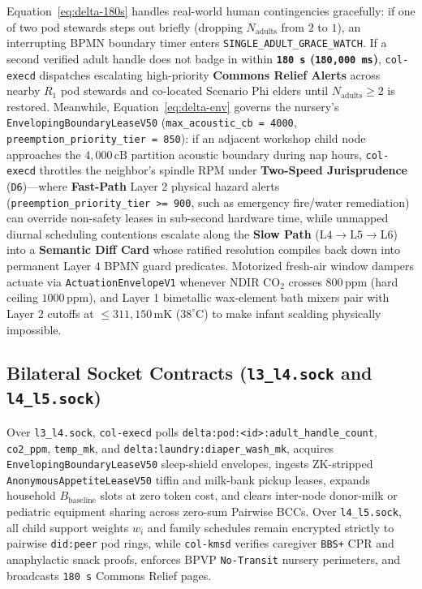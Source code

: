 Equation~\eqref{eq:delta-180s} handles real-world human contingencies gracefully: if one of
two pod stewards steps out briefly (dropping $N_{\mathrm{adults}}$ from $2$ to $1$), an
interrupting BPMN boundary timer enters \texttt{SINGLE\_ADULT\_GRACE\_WATCH}. If a second
verified adult handle does not badge in within \textbf{\texttt{180 s} (\texttt{180,000 ms})},
\texttt{col-execd} dispatches escalating high-priority \textbf{Commons Relief Alerts} across
nearby $R_1$ pod stewards and co-located Scenario Phi elders until $N_{\mathrm{adults}} \ge 2$
is restored. Meanwhile, Equation~\eqref{eq:delta-env} governs the nursery's
\texttt{EnvelopingBoundaryLeaseV50} (\texttt{max\_acoustic\_cb = 4000},
\texttt{preemption\_priority\_tier = 850}): if an adjacent workshop child node approaches the
$4{,}000\,\mathrm{cB}$ partition acoustic boundary during nap hours, \texttt{col-execd}
throttles the neighbor's spindle RPM under \textbf{Two-Speed Jurisprudence} (\texttt{D6})---where
\textbf{Fast-Path} Layer 2 physical hazard alerts (\texttt{preemption\_priority\_tier >= 900},
such as emergency fire/water remediation) can override non-safety leases in sub-second hardware
time, while unmapped diurnal scheduling contentions escalate along the \textbf{Slow Path}
($\mathrm{L4} \to \mathrm{L5} \to \mathrm{L6}$) into a \textbf{Semantic Diff Card} whose ratified
resolution compiles back down into permanent Layer 4 BPMN guard predicates. Motorized fresh-air
window dampers actuate via \texttt{ActuationEnvelopeV1} whenever NDIR $\mathrm{CO_2}$ crosses
$800\,\mathrm{ppm}$ (hard ceiling $1000\,\mathrm{ppm}$), and Layer 1 bimetallic wax-element bath
mixers pair with Layer 2 cutoffs at $\le 311{,}150\,\mathrm{mK}$ ($38^\circ\mathrm{C}$) to make
infant scalding physically impossible.

\subsection{Bilateral Socket Contracts (\texttt{l3\_l4.sock} and \texttt{l4\_l5.sock})}

Over \texttt{l3\_l4.sock}, \texttt{col-execd} polls \texttt{delta:pod:<id>:adult\_handle\_count},
\texttt{co2\_ppm}, \texttt{temp\_mk}, and \texttt{delta:laundry:diaper\_wash\_mk}, acquires
\texttt{EnvelopingBoundaryLeaseV50} sleep-shield envelopes, ingests ZK-stripped
\texttt{AnonymousAppetiteLeaseV50} tiffin and milk-bank pickup leases, expands household
$B_{\mathrm{baseline}}$ slots at zero token cost, and clears inter-node donor-milk or pediatric
equipment sharing across zero-sum Pairwise BCCs. Over \texttt{l4\_l5.sock}, all child support
weights $w_i$ and family schedules remain encrypted strictly to pairwise \texttt{did:peer} pod
rings, while \texttt{col-kmsd} verifies caregiver \texttt{BBS+} CPR and anaphylactic snack
proofs, enforces BPVP \texttt{No-Transit} nursery perimeters, and broadcasts \texttt{180 s}
Commons Relief pages.


